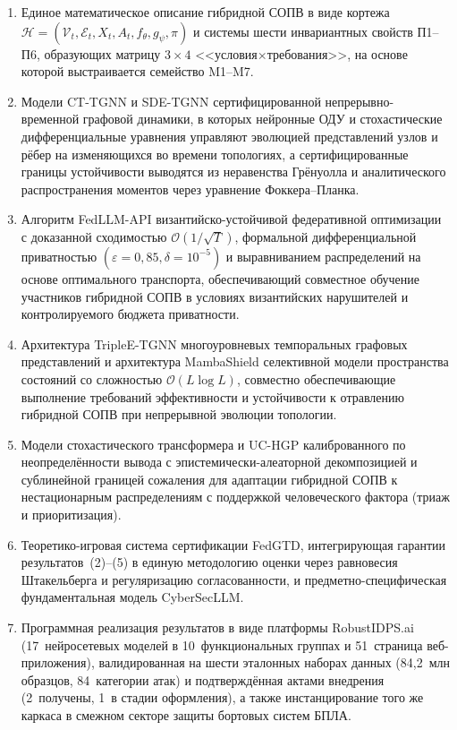 \documentclass[12pt,a5paper]{article}
\begin{document}
\begin{enumerate}
\item Единое математическое описание гибридной СОПВ в виде
кортежа $\mathcal{H} = (\mathcal{V}_t, \mathcal{E}_t, X_t,
A_t, f_\theta, g_\psi, \pi)$ и системы шести инвариантных
свойств П1--П6, образующих матрицу $3\times4$
<<условия$\times$требования>>, на основе которой выстраивается
семейство M1--M7.

\item Модели CT-TGNN и SDE-TGNN сертифицированной
непрерывно-временной графовой динамики, в которых нейронные
ОДУ и стохастические дифференциальные уравнения управляют
эволюцией представлений узлов и рёбер на изменяющихся во
времени топологиях, а сертифицированные границы устойчивости
выводятся из неравенства Грёнуолла и аналитического
распространения моментов через уравнение Фоккера--Планка.

\item Алгоритм FedLLM-API византийско-устойчивой
федеративной оптимизации с доказанной сходимостью
$\mathcal{O}(1/\sqrt{T})$, формальной дифференциальной
приватностью $(\varepsilon{=}0{,}85,\delta{=}10^{-5})$ и
выравниванием распределений на основе оптимального
транспорта, обеспечивающий совместное обучение участников
гибридной СОПВ в условиях византийских нарушителей и
контролируемого бюджета приватности.

\item Архитектура TripleE-TGNN многоуровневых темпоральных
графовых представлений и архитектура MambaShield селективной
модели пространства состояний со сложностью
$\mathcal{O}(L\log L)$, совместно обеспечивающие выполнение
требований эффективности и устойчивости к отравлению
гибридной СОПВ при непрерывной эволюции топологии.

\item Модели стохастического трансформера и UC-HGP
калиброванного по неопределённости вывода с
эпистемически-алеаторной декомпозицией и сублинейной
границей сожаления для адаптации гибридной СОПВ к
нестационарным распределениям с поддержкой человеческого
фактора (триаж и приоритизация).

\item Теоретико-игровая система сертификации FedGTD,
интегрирующая гарантии результатов~(2)--(5) в единую
методологию оценки через равновесия Штакельберга и
регуляризацию согласованности, и предметно-специфическая
фундаментальная модель CyberSecLLM.

\item Программная реализация результатов в виде платформы
RobustIDPS.ai (17~нейросетевых моделей в 10~функциональных
группах и 51~страница веб-приложения), валидированная на
шести эталонных наборах данных (84,2~млн образцов,
84~категории атак) и подтверждённая актами внедрения
(2~получены, 1~в стадии оформления), а также инстанцирование
того же каркаса в смежном секторе защиты бортовых систем
БПЛА.
\end{enumerate}
\end{document}
